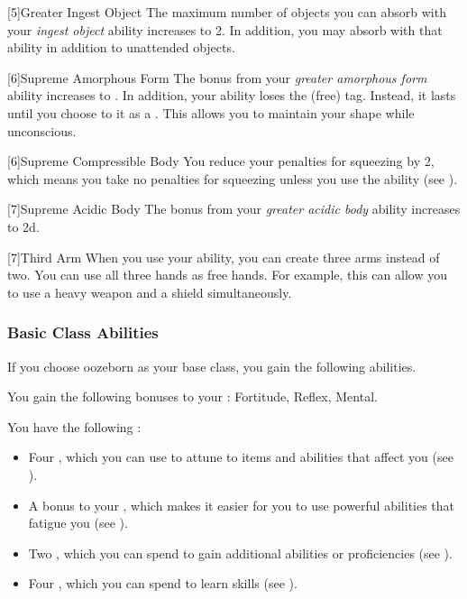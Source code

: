             [5]{Greater Ingest Object} The maximum number of objects you can absorb with your \textit{ingest object} ability increases to 2.
            In addition, you may absorb  with that ability in addition to unattended objects.

            [6]{Supreme Amorphous Form} The bonus from your \textit{greater amorphous form} ability increases to .
            In addition, your  ability loses the  (free) tag.
            Instead, it lasts until you choose to  it as a .
            This allows you to maintain your shape while unconscious.

            [6]{Supreme Compressible Body} You reduce your penalties for squeezing by 2, which means you take no penalties for squeezing unless you use the  ability (see ).

            [7]{Supreme Acidic Body} The bonus from your \textit{greater acidic body} ability increases to \plus2d.

            [7]{Third Arm} When you use your  ability, you can create three arms instead of two.
            You can use all three hands as free hands.
            For example, this can allow you to use a heavy weapon and a shield simultaneously.

        \subsubsection{Basic Class Abilities}
            If you choose oozeborn as your base class, you gain the following abilities.

            You gain the following bonuses to your :  Fortitude,  Reflex,  Mental.

             You have the following :
            \begin{itemize}
                \item Four , which you can use to attune to items and abilities that affect you (see ).
                \item A  bonus to your , which makes it easier for you to use powerful abilities that fatigue you (see ).
                \item Two , which you can spend to gain additional abilities or proficiencies (see ).
                \item Four , which you can spend to learn skills (see ).
            \end{itemize}

